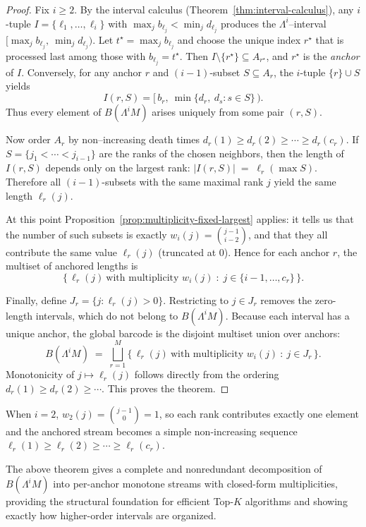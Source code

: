 \documentclass[runningheads]{llncs}
\newcommand{\B}{B}
\newcommand{\Lam}{\Lambda}
\begin{document}
\begin{proof}
Fix $i\ge 2$. By the interval calculus (Theorem~\ref{thm:interval-calculus}),
any $i$-tuple $I=\{\ell_1,\dots,\ell_i\}$ with
$\max_j b_{\ell_j}<\min_j d_{\ell_j}$ produces the $\Lam^i$–interval
$[\max_j b_{\ell_j},\ \min_j d_{\ell_j})$.
Let $t^\star=\max_j b_{\ell_j}$ and choose the unique index $r^\star$ that is
processed last among those with $b_{\ell_j}=t^\star$. Then
$I\setminus\{r^\star\}\subseteq A_{r^\star}$, and $r^\star$ is the
\emph{anchor} of $I$. Conversely, for any anchor $r$ and
$(i{-}1)$-subset $S\subseteq A_r$, the $i$-tuple $\{r\}\cup S$ yields
\[
I(r,S)=\bigl[\, b_r,\ \min\{d_r,\ d_s: s\in S\}\,\bigr).
\]
Thus every element of $\B(\Lam^i M)$ arises uniquely from some pair $(r,S)$.

Now order $A_r$ by non–increasing death times
$d_r(1)\ge d_r(2)\ge\cdots\ge d_r(c_r)$.
If $S=\{j_1<\cdots<j_{i-1}\}$ are the ranks of the chosen neighbors, then
the length of $I(r,S)$ depends only on the largest rank:
$|I(r,S)| \;=\;\ell_r(\max S).$
Therefore all $(i{-}1)$-subsets with the same maximal rank $j$ yield
the same length $\ell_r(j)$.

At this point Proposition~\ref{prop:multiplicity-fixed-largest} applies:
it tells us that the number of such subsets is exactly
$w_i(j)=\binom{j-1}{i-2}$, and that they all contribute the same
value $\ell_r(j)$ (truncated at $0$).
Hence for each anchor $r$, the multiset of anchored lengths is
\[
\bigl\{\, \ell_r(j)\ \text{with multiplicity } w_i(j) \;:\;
  j\in\{i-1,\dots,c_r\}\,\bigr\}.
\]

Finally, define $J_r=\{j: \ell_r(j)>0\}$. Restricting to $j\in J_r$
removes the zero-length intervals, which do not belong to
$\B(\Lam^i M)$. Because each interval has a unique anchor,
the global barcode is the disjoint multiset union over anchors:
\[
\B(\Lam^i M)\;=\;\bigsqcup_{r=1}^M
   \bigl\{\, \ell_r(j)\ \text{with multiplicity } w_i(j)\ :\ j\in J_r \,\bigr\}.
\]
Monotonicity of $j\mapsto \ell_r(j)$ follows directly from
the ordering $d_r(1)\ge d_r(2)\ge\cdots$.
This proves the theorem.
\end{proof}

When $i=2$, $w_2(j)=\binom{j-1}{0}=1$, so each rank contributes exactly one element and the anchored stream becomes a simple non-increasing sequence $\ell_r(1)\ge \ell_r(2)\ge\cdots\ge \ell_r(c_r)$.

The above theorem gives a complete and nonredundant
decomposition of $\B(\Lambda^i M)$ into per-anchor monotone streams with
closed-form multiplicities, providing the structural foundation for efficient
Top-$K$ algorithms and showing exactly how higher-order intervals are organized. 
\end{document}
